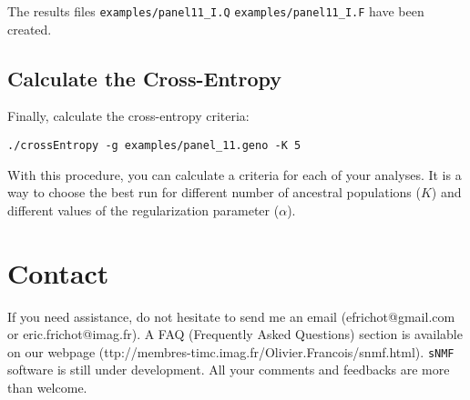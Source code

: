 \documentclass[10pt,a4paper]{article}
\begin{document}
\noindent
The results files \verb|examples/panel11_I.Q| \verb|examples/panel11_I.F| have been created.

\subsection{Calculate the Cross-Entropy}

Finally, calculate the cross-entropy criteria:
\begin{Verbatim}[frame=single]
./crossEntropy -g examples/panel_11.geno -K 5
\end{Verbatim}

\noindent
With this procedure, you can calculate a criteria for each of your analyses. It is a way to 
choose the best run for different number of ancestral populations ($K$) and different values 
of the regularization parameter ($\alpha$).

\section{Contact}
If you need assistance, do not hesitate to send me an email (efrichot@gmail.com or eric.frichot@imag.fr). 
A FAQ (Frequently Asked Questions) section is available 
on our webpage (ttp://membres-timc.imag.fr/Olivier.Francois/snmf.html). 
{\tt sNMF} software is still under development. All your comments and feedbacks are more than welcome.



\end{document}
